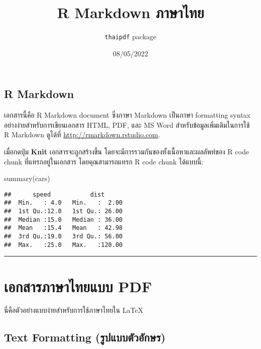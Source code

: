\documentclass[
]{article}
\title{R Markdown ภาษาไทย}
\author{\texttt{thaipdf} package}
\date{08/05/2022}
\newenvironment{Shaded}{\begin{snugshade}}{\end{snugshade}}
\newcommand{\FunctionTok}[1]{\textcolor[rgb]{0.00,0.00,0.00}{#1}}
\newcommand{\NormalTok}[1]{#1}
\begin{document}
\maketitle

\sloppy %

\hypertarget{r-markdown}{%
\subsection{R Markdown}\label{r-markdown}}

เอกสารนี้คือ R Markdown document ซึ่งภาษา Markdown เป็นภาษา formatting
syntax อย่างง่ายสำหรับการเขียนเอกสาร HTML, PDF, และ MS Word
สำหรับข้อมูลเพิ่มเติมในการใช้ R Markdown ดูได้ที่
\url{http://rmarkdown.rstudio.com}.

เมื่อกดปุ่ม \textbf{Knit} เอกสารจะถูกสร้างขึ้น
โดยจะมีการรวมกันของทั้งเนื้อหาและผลลัพท์ของ R code chunk
ที่แทรกอยู่ในเอกสาร โดยคุณสามารถแทรก R code chunk ได้แบบนี้:

\begin{Shaded}
\begin{Highlighting}[]
\FunctionTok{summary}\NormalTok{(cars)}
\end{Highlighting}
\end{Shaded}

\begin{verbatim}
##      speed           dist       
##  Min.   : 4.0   Min.   :  2.00  
##  1st Qu.:12.0   1st Qu.: 26.00  
##  Median :15.0   Median : 36.00  
##  Mean   :15.4   Mean   : 42.98  
##  3rd Qu.:19.0   3rd Qu.: 56.00  
##  Max.   :25.0   Max.   :120.00
\end{verbatim}

\begin{center}\rule{0.5\linewidth}{0.5pt}\end{center}

\hypertarget{uxe40uxe2duxe01uxe2auxe32uxe23uxe20uxe32uxe29uxe32uxe44uxe17uxe22uxe41uxe1auxe1a-pdf}{%
\section{เอกสารภาษาไทยแบบ
PDF}\label{uxe40uxe2duxe01uxe2auxe32uxe23uxe20uxe32uxe29uxe32uxe44uxe17uxe22uxe41uxe1auxe1a-pdf}}

นี่คือตัวอย่างแบบง่ายสำหรับการใช้ภาษาไทยใน \LaTeX

\hypertarget{text-formatting-uxe23uxe1buxe41uxe1auxe1auxe15uxe27uxe2duxe01uxe29uxe23}{%
\subsection{Text Formatting
(รูปแบบตัวอักษร)}\label{text-formatting-uxe23uxe1buxe41uxe1auxe1auxe15uxe27uxe2duxe01uxe29uxe23}}
\end{document}
